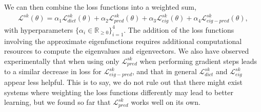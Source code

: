 \documentclass{article}
\begin{document}
We can then combine the loss functions into a weighted sum,
\begin{align*}
    \mathcal{L}^{sk}(\theta) = \alpha_1 \mathcal{L}^{sk}_{dict}(\theta) + \alpha_2 \mathcal{L}^{sk}_{pred}(\theta) + \alpha_3 \mathcal{L}^{sk}_{eig}(\theta) + \alpha_4 \mathcal{L}^{sk}_{eig-pred}(\theta),
\end{align*} 
with hyperparameters \(\{\alpha_i \in \mathbb{R}_{\geq 0}\}_{i=1}^4\). The addition of the loss functions involving the approximate eigenfunctions requires additional computational resources to compute the eigenvalues and eigenvectors. We also have observed experimentally that when using only \(\mathcal{L}^{sk}_{pred}\) when performing gradient steps leads to a similar decrease in loss for \(\mathcal{L}^{sk}_{eig-pred}\), and that in general \(\mathcal{L}^{sk}_{dict}\) and \(\mathcal{L}^{sk}_{eig}\) appear less helpful. This is to say, we do not rule out that there might exist systems where weighting the loss functions differently may lead to better learning, but we found so far that \(\mathcal{L}^{sk}_{pred}\) works well on its own.
\end{document}
